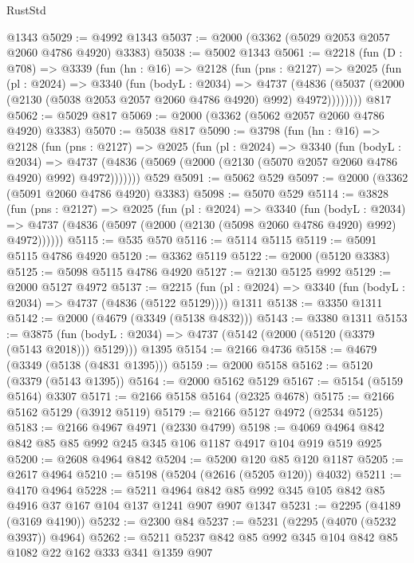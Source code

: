 \begin{lexlean}{RustStd}
\begin{coremodule}
    @1343
@5029 := @4992 @1343
@5037 := @2000 (@3362 (@5029 @2053 @2057 @2060 @4786 @4920) @3383)
@5038 := @5002 @1343
@5061 := @2218
    (fun (D : @708) =>
    @3339
      (fun (hn : @16) =>
      @2128
        (fun (pns : @2127) =>
        @2025
          (fun (pl : @2024) =>
          @3340
            (fun (bodyL : @2034) =>
            @4737
              (@4836 (@5037 (@2000 (@2130 (@5038 @2053 @2057 @2060 @4786 @4920) @992) @4972))))))))
    @817
@5062 := @5029 @817
@5069 := @2000 (@3362 (@5062 @2057 @2060 @4786 @4920) @3383)
@5070 := @5038 @817
@5090 := @3798
    (fun (hn : @16) =>
    @2128
      (fun (pns : @2127) =>
      @2025
        (fun (pl : @2024) =>
        @3340
          (fun (bodyL : @2034) =>
          @4737 (@4836 (@5069 (@2000 (@2130 (@5070 @2057 @2060 @4786 @4920) @992) @4972)))))))
    @529
@5091 := @5062 @529
@5097 := @2000 (@3362 (@5091 @2060 @4786 @4920) @3383)
@5098 := @5070 @529
@5114 := @3828
    (fun (pns : @2127) =>
    @2025
      (fun (pl : @2024) =>
      @3340
        (fun (bodyL : @2034) =>
        @4737 (@4836 (@5097 (@2000 (@2130 (@5098 @2060 @4786 @4920) @992) @4972))))))
@5115 := @535 @570
@5116 := @5114 @5115
@5119 := @5091 @5115 @4786 @4920
@5120 := @3362 @5119
@5122 := @2000 (@5120 @3383)
@5125 := @5098 @5115 @4786 @4920
@5127 := @2130 @5125 @992
@5129 := @2000 @5127 @4972
@5137 := @2215
    (fun (pl : @2024) => @3340 (fun (bodyL : @2034) => @4737 (@4836 (@5122 @5129))))
    @1311
@5138 := @3350 @1311
@5142 := @2000 (@4679 (@3349 (@5138 @4832)))
@5143 := @3380 @1311
@5153 := @3875
    (fun (bodyL : @2034) => @4737 (@5142 (@2000 (@5120 (@3379 (@5143 @2018))) @5129)))
    @1395
@5154 := @2166 @4736
@5158 := @4679 (@3349 (@5138 (@4831 @1395)))
@5159 := @2000 @5158
@5162 := @5120 (@3379 (@5143 @1395))
@5164 := @2000 @5162 @5129
@5167 := @5154 (@5159 @5164) @3307
@5171 := @2166 @5158 @5164 (@2325 @4678)
@5175 := @2166 @5162 @5129 (@3912 @5119)
@5179 := @2166 @5127 @4972 (@2534 @5125)
@5183 := @2166 @4967 @4971 (@2330 @4799)
@5198 := @4069 @4964 @842 @842 @85 @85 @992 @245 @345 @106 @1187 @4917 @104 @919 @519 @925
@5200 := @2608 @4964 @842
@5204 := @5200 @120 @85 @120 @1187
@5205 := @2617 @4964
@5210 := @5198 (@5204 (@2616 (@5205 @120)) @4032)
@5211 := @4170 @4964
@5228 := @5211 @4964 @842 @85 @992 @345 @105 @842 @85 @4916 @37 @167 @104 @137 @1241 @907 @907 @1347
@5231 := @2295 (@4189 (@3169 @4190))
@5232 := @2300 @84
@5237 := @5231 (@2295 (@4070 (@5232 @3937)) @4964)
@5262 := @5211
    @5237
    @842
    @85
    @992
    @345
    @104
    @842
    @85
    @1082
    @22
    @162
    @333
    @341
    @1359
    @907

\end{coremodule}
\end{lexlean}

